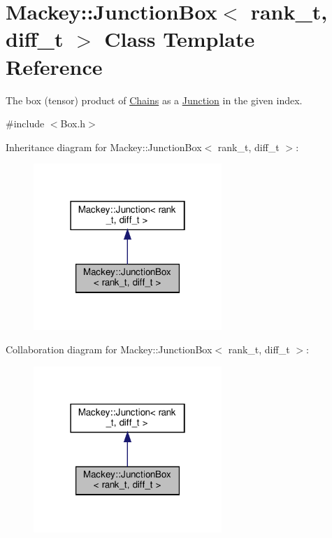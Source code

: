 \hypertarget{classMackey_1_1JunctionBox}{}\section{Mackey\+:\+:Junction\+Box$<$ rank\+\_\+t, diff\+\_\+t $>$ Class Template Reference}
\label{classMackey_1_1JunctionBox}


The box (tensor) product of \hyperlink{classMackey_1_1Chains}{Chains} as a \hyperlink{classMackey_1_1Junction}{Junction} in the given index.  




{\ttfamily \#include $<$Box.\+h$>$}



Inheritance diagram for Mackey\+:\+:Junction\+Box$<$ rank\+\_\+t, diff\+\_\+t $>$\+:\nopagebreak
\begin{figure}[H]
\begin{center}
\leavevmode
\includegraphics[width=202pt]{classMackey_1_1JunctionBox__inherit__graph}
\end{center}
\end{figure}


Collaboration diagram for Mackey\+:\+:Junction\+Box$<$ rank\+\_\+t, diff\+\_\+t $>$\+:\nopagebreak
\begin{figure}[H]
\begin{center}
\leavevmode
\includegraphics[width=202pt]{classMackey_1_1JunctionBox__coll__graph}
\end{center}
\end{figure}
